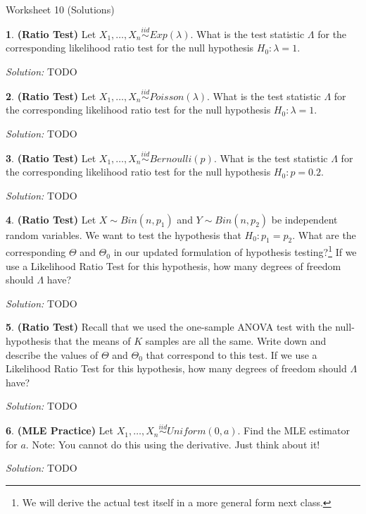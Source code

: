 \documentclass{tufte-handout}
\newcommand{\iid}{\stackrel{iid}{\sim}}
\begin{document}
\justify

{\LARGE Worksheet 10 (Solutions)}

\vspace*{18pt}


\textbf{1}. \textbf{(Ratio Test)} Let $X_1, \ldots, X_n \iid Exp(\lambda)$.
What is the test statistic $\Lambda$ for the corresponding likelihood 
ratio test for the null hypothesis $H_0: \lambda = 1$.

\textit{Solution:} TODO

\textbf{2}. \textbf{(Ratio Test)} Let $X_1, \ldots, X_n \iid Poisson(\lambda)$.
What is the test statistic $\Lambda$ for the corresponding likelihood 
ratio test for the null hypothesis $H_0: \lambda = 1$.

\textit{Solution:} TODO

\textbf{3}. \textbf{(Ratio Test)} Let $X_1, \ldots, X_n \iid Bernoulli(p)$.
What is the test statistic $\Lambda$ for the corresponding likelihood 
ratio test for the null hypothesis $H_0: p = 0.2$.

\textit{Solution:} TODO

\textbf{4}. \textbf{(Ratio Test)} Let $X \sim Bin(n, p_1)$ and $Y \sim Bin(n, p_2)$ be
independent random variables. We want to test the hypothesis that
$H_0: p_1 = p_2$. What are the corresponding $\Theta$ and $\Theta_0$ in
our updated formulation of hypothesis testing?\footnote{
  We will derive the actual test itself in a more general form next
  class.
} If we use a Likelihood Ratio Test for this hypothesis, how many degrees of
freedom should $\Lambda$ have?

\textit{Solution:} TODO

\textbf{5}. \textbf{(Ratio Test)} Recall that we used the one-sample ANOVA test with the
null-hypothesis that the means of $K$ samples are all the same. Write down and
describe the values of $\Theta$ and $\Theta_0$ that correspond to this test. 
If we use a Likelihood Ratio Test for this hypothesis, how many degrees of
freedom should $\Lambda$ have?

\textit{Solution:} TODO

\textbf{6}. \textbf{(MLE Practice)} Let $X_1, \ldots, X_n \iid Uniform(0, a)$. Find the MLE
estimator for $a$. Note: You cannot do this using the derivative. Just think about it!

\textit{Solution:} TODO
\end{document}
